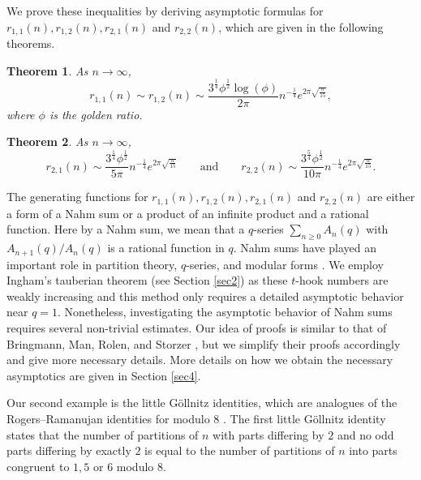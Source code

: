\documentclass[11pt,reqno]{amsart}
\newtheorem{theorem}{Theorem}[section]
\theoremstyle{remark}
\numberwithin{equation}{section}
\begin{document}
We prove these inequalities by deriving asymptotic formulas for $r_{1,1}(n), r_{1,2}(n), r_{2,1}(n)$ and $r_{2,2}(n)$, which are given in the following theorems.

\begin{theorem}\label{thm:r1_asymp}
	As $n \to \infty$,
	\[
		r_{1,1}(n) \sim r_{1,2}(n) \sim \frac{3^{\frac14} \phi^{\frac12}  \log(\phi) }{2 \pi} n^{-\frac14}e^{2\pi \sqrt{\frac{n}{15}}},
	\]
	where $\phi$ is the golden ratio. 
\end{theorem}


 \begin{theorem}\label{thm:r2_asymp}
	As $n \to \infty$,
	\[
		r_{2,1}(n) \sim  \frac{3^{\frac14}  \phi^{\frac12}}{5 \pi} n^{-\frac14}e^{2\pi \sqrt{\frac{n}{15}}} \qquad \text{and} \qquad r_{2,2}(n) \sim  \frac{3^{\frac54}  \phi^{\frac12}}{10 \pi} n^{-\frac14}e^{2\pi \sqrt{\frac{n}{15}}}. 
	\]
\end{theorem}


The generating functions for $r_{1,1}(n), r_{1,2}(n), r_{2,1}(n)$ and $r_{2,2}(n)$ are either a form of a Nahm sum or a product of an infinite product and a rational function. Here by a Nahm sum, we mean that a $q$-series $\sum_{n \geq 0} A_n (q)$ with $A_{n+1}(q)/A_{n}(q)$ is a rational function in $q$. Nahm sums have played an important role in partition theory, $q$-series, and modular forms \cite{BMRS, VZ, W, Z}. We employ Ingham's tauberian theorem (see Section \ref{sec2}) as these $t$-hook numbers are weakly increasing and this method only requires a detailed asymptotic behavior near $q=1$. Nonetheless, investigating the asymptotic behavior of Nahm sums requires several non-trivial estimates. Our idea of proofs is similar to that of Bringmann,  Man, Rolen, and Storzer \cite{BMRS}, but we simplify their proofs accordingly and give more necessary details.  More details on how we obtain the necessary asymptotics are given in Section \ref{sec4}. 




Our second example is the little G\"ollnitz identities, which are analogues of the Rogers--Ramanujan identities for modulo 8  \cite{gollnitz}. 
The first little G\"ollnitz identity states that the number of partitions of $n$ with parts differing by $2$ and no odd parts differing by exactly $2$ is equal to the number of partitions of $n$ into parts congruent to $1, 5$ or $6$ modulo $8$.
\end{document}
